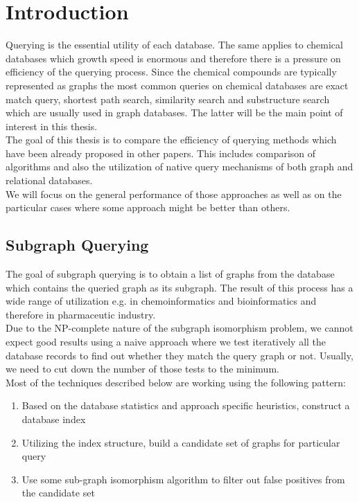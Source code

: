 \chapter*{Introduction}

Querying is the essential utility of each database. The same applies to chemical databases which growth speed is enormous and therefore there is a pressure on efficiency of the querying process. Since the chemical compounds are typically represented as graphs the most common queries on chemical databases are exact match query, shortest path search, similarity search and substructure search which are usually used in graph databases. The latter will be the main point of interest in this thesis.\\


The goal of this thesis is to compare the efficiency of querying methods which have been already proposed in other papers. This includes comparison of algorithms and also the utilization of native query mechanisms of both graph and relational databases.\\

We will focus on the general performance of those approaches as well as on the particular cases where some approach might be better than others.


\section*{Subgraph Querying}

The goal of subgraph querying is to obtain a list of graphs from the database which contains the queried graph as its subgraph. The result of this process has a wide range of utilization e.g. in chemoinformatics and bioinformatics and therefore in pharmaceutic industry.\\

Due to the NP-complete nature of the subgraph isomorphism problem, we cannot expect good results using a naive approach where we test iteratively all the database records to find out whether they match the query graph or not. Usually, we need to cut down the number of those tests to the minimum.\\


Most of the techniques described below are working using the following pattern:
\begin{enumerate}
\item Based on the database statistics and approach specific heuristics, construct a database index
\item Utilizing the index structure, build a candidate set of graphs for particular query
\item Use some sub-graph isomorphism algorithm to filter out false positives from the candidate set
\end{enumerate}



